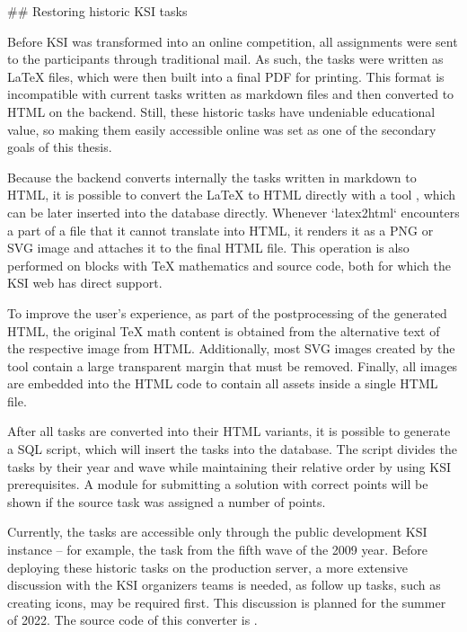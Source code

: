 \documentclass[
  digital, %
  oneside, %
  lof,     %
  nolot,     %
]{fithesis4}
\begin{document}
{## Restoring historic \acrshort{KSI} tasks

Before \acrshort{KSI} was transformed into an online competition, all assignments were sent to the participants through traditional mail. As such, the tasks were written as \LaTeX{} files, which were then built into a final \acrshort{PDF} for printing. This format is incompatible with current tasks written as markdown files and then converted to \acrshort{HTML} on the backend. Still, these historic tasks have undeniable educational value, so making them easily accessible online	was set as one of the secondary goals of this thesis.

Because the backend converts internally the tasks written in markdown to \acrshort{HTML}, it is possible to convert the \LaTeX{} to \acrshort{HTML} directly with a tool , which can be later inserted into the database directly. Whenever `latex2html` encounters a part of a file that it cannot translate into \acrshort{HTML}, it renders it as a \acrshort{PNG} or \acrshort{SVG} image and attaches it to the final \acrshort{HTML} file. This operation is also performed on blocks with TeX mathematics and source code, both for which the \acrshort{KSI} web has direct support.

To improve the user's experience, as part of the postprocessing of the generated \acrshort{HTML}, the original TeX math content is obtained from the alternative text of the respective image from \acrshort{HTML}. Additionally, most \acrshort{SVG} images created by the tool contain a large transparent margin that must be removed. Finally, all images are embedded into the \acrshort{HTML} code to contain all assets inside a single \acrshort{HTML} file.

After all tasks are converted into their \acrshort{HTML} variants, it is possible to generate a SQL script, which will insert the tasks into the database. The script divides the tasks by their year and wave while maintaining their relative order by using \acrshort{KSI} prerequisites. A module for submitting a solution with correct points will be shown if the source task was assigned a number of points.

Currently, the tasks are accessible only through the public development \acrshort{KSI} instance -- for example, the task  from the fifth wave of the 2009 year. Before deploying these historic tasks on the production server, a more extensive discussion with the \acrshort{KSI} organizers teams is needed, as follow up tasks, such as creating icons, may be required first. This discussion is planned for the summer of 2022. The source code of this converter is .

}
\end{document}
